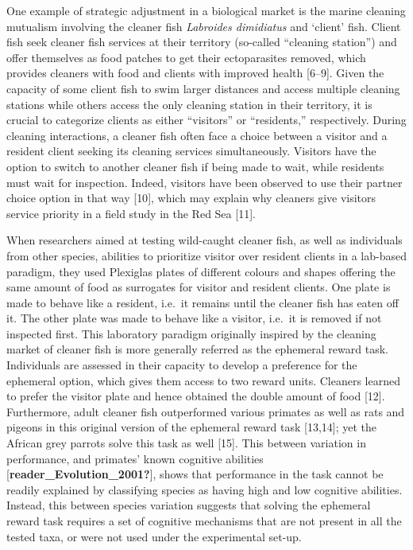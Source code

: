 \documentclass[10pt,letterpaper]{article}
\begin{document}
One example of strategic adjustment in a biological market is the marine
cleaning mutualism involving the cleaner fish \emph{Labroides
dimidiatus} and `client' fish. Client fish seek cleaner fish services at
their territory (so-called ``cleaning station'') and offer themselves as
food patches to get their ectoparasites removed, which provides cleaners
with food and clients with improved health {[}6--9{]}. Given the
capacity of some client fish to swim larger distances and access
multiple cleaning stations while others access the only cleaning station
in their territory, it is crucial to categorize clients as either
``visitors'' or ``residents,'' respectively. During cleaning
interactions, a cleaner fish often face a choice between a visitor and a
resident client seeking its cleaning services simultaneously. Visitors
have the option to switch to another cleaner fish if being made to wait,
while residents must wait for inspection. Indeed, visitors have been
observed to use their partner choice option in that way {[}10{]}, which
may explain why cleaners give visitors service priority in a field study
in the Red Sea {[}11{]}.

When researchers aimed at testing wild-caught cleaner fish, as well as
individuals from other species, abilities to prioritize visitor over
resident clients in a lab-based paradigm, they used Plexiglas plates of
different colours and shapes offering the same amount of food as
surrogates for visitor and resident clients. One plate is made to behave
like a resident, i.e.~it remains until the cleaner fish has eaten off
it. The other plate was made to behave like a visitor, i.e.~it is
removed if not inspected first. This laboratory paradigm originally
inspired by the cleaning market of cleaner fish is more generally
referred as the ephemeral reward task. Individuals are assessed in their
capacity to develop a preference for the ephemeral option, which gives
them access to two reward units. Cleaners learned to prefer the visitor
plate and hence obtained the double amount of food {[}12{]}.
Furthermore, adult cleaner fish outperformed various primates as well as
rats and pigeons in this original version of the ephemeral reward task
{[}13,14{]}; yet the African grey parrots solve this task as well
{[}15{]}. This between variation in performance, and primates' known
cognitive abilities {[}\textbf{reader\_Evolution\_2001?}{]}, shows that
performance in the task cannot be readily explained by classifying
species as having high and low cognitive abilities. Instead, this
between species variation suggests that solving the ephemeral reward
task requires a set of cognitive mechanisms that are not present in all
the tested taxa, or were not used under the experimental set-up.
\end{document}

